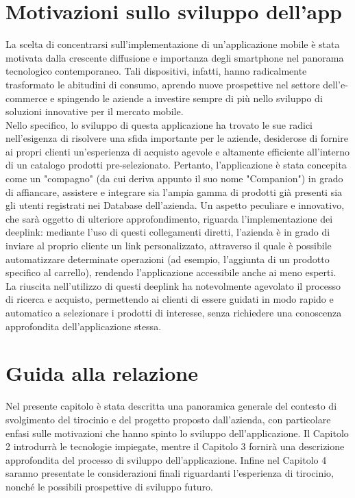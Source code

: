 \section{Motivazioni sullo sviluppo dell'app}
La scelta di concentrarsi sull'implementazione di un'applicazione mobile è stata motivata dalla crescente diffusione e importanza degli smartphone nel panorama tecnologico contemporaneo. Tali dispositivi, infatti, hanno radicalmente trasformato le abitudini di consumo, aprendo nuove prospettive nel settore dell'e-commerce e spingendo le aziende a investire sempre di più nello sviluppo di soluzioni innovative per il mercato mobile.\\
Nello specifico, lo sviluppo di questa applicazione ha trovato le sue radici nell'esigenza di risolvere una sfida importante per le aziende, desiderose di fornire ai propri clienti un'esperienza di acquisto agevole e altamente efficiente all'interno di un catalogo prodotti pre-selezionato. Pertanto, l'applicazione è stata concepita come un "compagno" (da cui deriva appunto il suo nome "Companion") in grado di affiancare, assistere e integrare sia l'ampia gamma di prodotti già presenti sia gli utenti registrati nei Database dell'azienda. Un aspetto peculiare e innovativo, che sarà oggetto di ulteriore approfondimento, riguarda l'implementazione dei deeplink: mediante l'uso di questi collegamenti diretti, l'azienda è in grado di inviare al proprio cliente un link personalizzato, attraverso il quale è possibile automatizzare determinate operazioni (ad esempio, l'aggiunta di un prodotto specifico al carrello), rendendo l'applicazione accessibile anche ai meno esperti.\\
La riuscita nell'utilizzo di questi deeplink ha notevolmente agevolato il processo di ricerca e acquisto, permettendo ai clienti di essere guidati in modo rapido e automatico a selezionare i prodotti di interesse, senza richiedere una conoscenza approfondita dell'applicazione stessa.

\section{Guida alla relazione}
Nel presente capitolo è stata descritta una panoramica generale del contesto di svolgimento del tirocinio e del progetto proposto dall'azienda, con particolare enfasi sulle motivazioni che hanno spinto lo sviluppo dell'applicazione. Il Capitolo 2 introdurrà le tecnologie impiegate, mentre il Capitolo 3 fornirà una descrizione approfondita del processo di sviluppo dell'applicazione. Infine nel Capitolo 4 saranno presentate le considerazioni finali riguardanti l'esperienza di tirocinio, nonché le possibili prospettive di sviluppo futuro.
